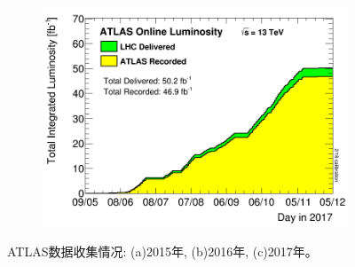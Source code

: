 \begin{figure}[!htbp]
\begin{subfigure}[b]{0.45\textwidth}
      \includegraphics[width=\textwidth]{fig/sumLumiByDay_2017.png}
      \caption{}
      \label{fig:data_taking_2017}
    \end{subfigure}
    \caption{ATLAS数据收集情况: (a)2015年, (b)2016年, (c)2017年。}
    \label{fig:data_taking}
\end{figure}
